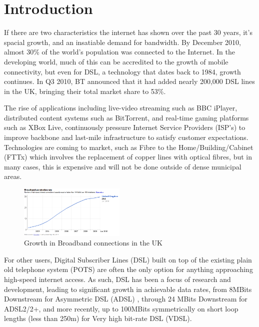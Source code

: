 \chapter{Introduction}
If there are two characteristics the internet has shown over the past 30 years, it's spacial growth, and an insatiable demand for bandwidth.
By December 2010, almost 30\% of the world's population was connected to the Internet. In the developing world, much of this can be accredited to the growth of mobile connectivity, but even for DSL, a technology that dates back to 1984, growth continues. In Q3 2010, BT announced that it had added nearly 200,000 DSL lines in the UK, bringing their total market share to 53\%.\cite{BP11}

The rise of applications including  live-video streaming such as BBC iPlayer, distributed content systems such as BitTorrent, and real-time gaming platforms such as XBox Live, continuously pressure Internet Service Providers (ISP's) to improve backbone and last-mile infrastructure to satisfy customer expectations.
Technologies are coming to market, such as Fibre to the Home/Building/Cabinet (FTTx) which involves the replacement of copper lines with optical fibres, but in many cases, this is expensive and will not be done outside of dense municipal areas.

\begin{figure}[ht!]
 \centering
 \includegraphics[width=0.45\textwidth]{images/BT-DSL-growth.png}
 \caption{Growth in Broadband connections in the UK}
 \label{fig:bt-dsl-stats}
\end{figure}

For other users, Digital Subscriber Lines (DSL) built on top of the existing plain old telephone system (POTS) are often the only option for anything approaching high-speed internet access. As such, DSL has been a focus of research and development, leading to significant growth in achievable data rates, from 8MBits Downstream for Asymmetric DSL (ADSL) , through 24 MBits Downstream for ADSL2/2+, and more recently, up to 100MBits symmetrically on short loop lengths (less than 250m) for Very high bit-rate DSL (VDSL).

